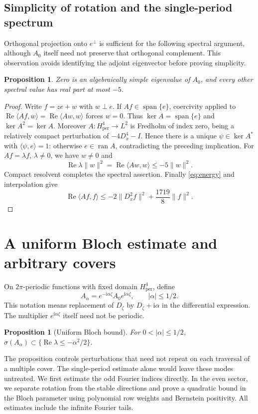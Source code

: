 \documentclass[a4paper,11pt]{article}
\numberwithin{equation}{section}
\newtheorem{proposition}[theorem]{Proposition}
\theoremstyle{definition}
\theoremstyle{remark}
\newcommand{\ii}{\mathrm i}
\newcommand{\per}{\mathrm{per}}
\newcommand{\norm}[1]{\lVert#1\rVert}
\newcommand{\ip}[2]{\langle#1,#2\rangle}
\renewcommand{\Re}{\operatorname{Re}}
\begin{document}
\subsection{Simplicity of rotation and the single-period spectrum}
Orthogonal projection onto $e^\perp$ is sufficient for the following spectral argument, although $A_0$ itself need not preserve that orthogonal complement. This observation avoids identifying the adjoint eigenvector before proving simplicity.
\begin{proposition}\label{prop:single-spectrum}
Zero is an algebraically simple eigenvalue of $A_0$, and every other spectral value has real part at most $-5$.
\end{proposition}
\begin{proof}
Write $f=ze+w$ with $w\perp e$. If $Af\in\operatorname{span}\{e\}$, coercivity applied to $\Re\ip{Af}w=\Re\ip{Aw}w$ forces $w=0$. Thus $\ker A=\operatorname{span}\{e\}$ and $\ker A^2=\ker A$. Moreover $A:H^4_\per\to L^2$ is Fredholm of index zero, being a relatively compact perturbation of $-4D_x^4-I$. Hence there is a unique $\psi\in\ker A^*$ with $\ip\psi e=1$: otherwise $e\in\operatorname{ran}A$, contradicting the preceding implication. For $Af=\lambda f$, $\lambda\ne0$, we have $w\ne0$ and
\[
 \Re\lambda\norm w^2=\Re\ip{Aw}w\le-5\norm w^2.
\]
Compact resolvent completes the spectral assertion. Finally \eqref{eq:energy} and interpolation give
\begin{equation}\label{eq:interpolation}
 \Re\ip{Af}f\le-2\norm{D_x^2f}^2+\frac{1719}{8}\norm f^2.
\end{equation}
\end{proof}


\section{A uniform Bloch estimate and arbitrary covers}\label{app:bloch}
On $2\pi$-periodic functions with fixed domain $H^4_\per$, define
\begin{equation}\label{eq:bloch-definition}
 A_\alpha=e^{-\ii\alpha\zeta}A_0e^{\ii\alpha\zeta},\qquad |\alpha|\le1/2.
\end{equation}
This notation means replacement of $D_\zeta$ by $D_\zeta+\ii\alpha$ in the differential expression. The multiplier $e^{\ii\alpha\zeta}$ itself need not be periodic.
\begin{proposition}[Uniform Bloch bound]\label{prop:bloch}
For $0<|\alpha|\le1/2$, $\sigma(A_\alpha)\subset\{\Re\lambda\le-\alpha^2/2\}$.
\end{proposition}
The proposition controls perturbations that need not repeat on each traversal of a multiple cover. The single-period estimate alone would leave these modes untreated. We first estimate the odd Fourier indices directly. In the even sector, we separate rotation from the stable directions and prove a quadratic bound in the Bloch parameter using polynomial row weights and Bernstein positivity. All estimates include the infinite Fourier tails.
\end{document}
